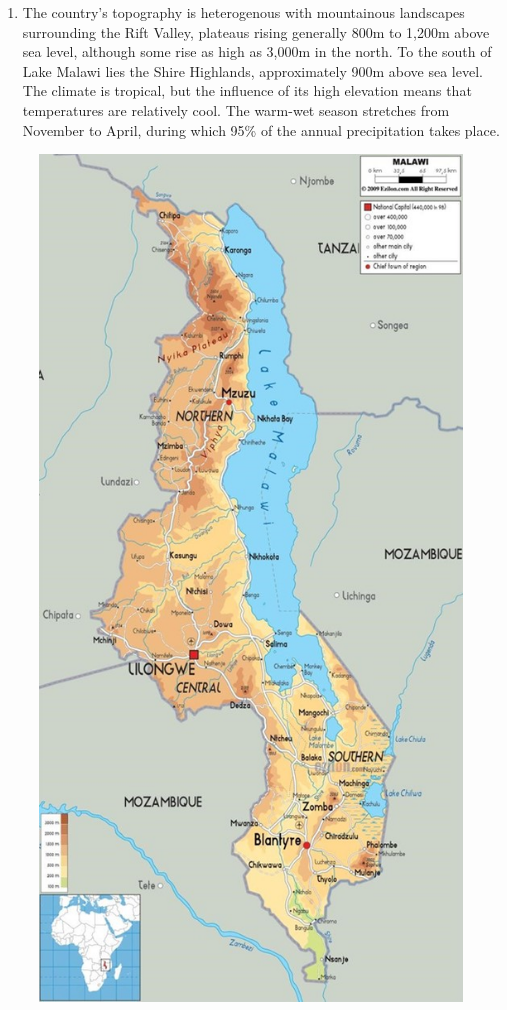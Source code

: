 \documentclass[
]{book}
\providecommand{\tightlist}{%
  \setlength{\itemsep}{0pt}\setlength{\parskip}{0pt}}
\begin{document}
\begin{enumerate}
\def\labelenumi{\arabic{enumi}.}
\setcounter{enumi}{14}
\tightlist
\item
  The country's topography is heterogenous with mountainous landscapes surrounding the Rift Valley, plateaus rising generally 800m to 1,200m above sea level, although some rise as high as 3,000m in the north. To the south of Lake Malawi lies the Shire Highlands, approximately 900m above sea level. The climate is tropical, but the influence of its high elevation means that temperatures are relatively cool. The warm-wet season stretches from November to April, during which 95\% of the annual precipitation takes place.
\end{enumerate}

\begin{figure}
\centering
\includegraphics{images/topography.jpg}

\end{figure}
\end{document}
